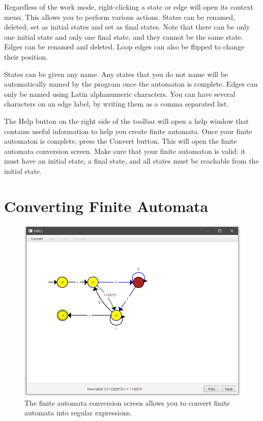 \documentclass[12pt]{report}
\begin{document}
Regardless of the work mode, right-clicking a state or edge will open its
context menu. This allows you to perform various actions. States can be renamed,
deleted, set as initial states and set as final states. Note that there can be
only one initial state and only one final state, and they cannot be the same
state. Edges can be renamed and deleted. Loop edges can also be flipped to
change their position. 

States can be given any name. Any states that you do not name will be
automatically named by the program once the automaton is complete. Edges can
only be named using Latin alphanumeric characters. You can have several
characters on an edge label, by writing them as a comma separated list.

The Help button on the right side of the toolbar will open a help window that
contains useful information to help you create finite automata. Once your finite
automaton is complete, press the Convert button. This will open the finite
automata conversion screen. Make sure that your finite automaton is valid: it
must have an initial state, a final state, and all states must be reachable from
the initial state.

\section{Converting Finite Automata} \label{ConvertingFiniteAutomata}

\begin{figure}[htb]
    \centering
    \includegraphics[width=\textwidth]{./Diagrams/ConvertFAScreen.png}
    \caption{The finite automata conversion screen allows you to convert finite
    automata into regular expressions.}
    \label{ConvertFAScreen}
\end{figure}
\end{document}
